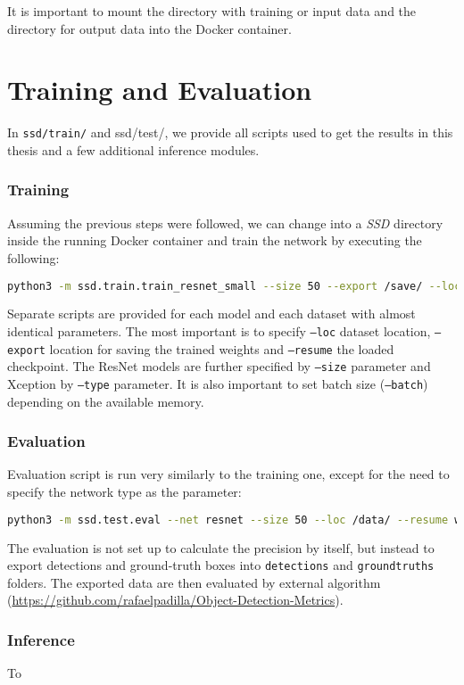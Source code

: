 It is important to mount the directory with training or input data and the directory for output data into the Docker container.


\section{Training and Evaluation}

In {\tt ssd/train/} and {ssd/test/}, we provide all scripts used to get the results in this thesis and a few additional inference modules. 

\subsubsection{Training}
Assuming the previous steps were followed, we can change into a \textit{SSD} directory inside the running Docker container and train the network by executing the following:

\begin{lstlisting}[breaklines, frame=single, language=Bash, basicstyle=\ttfamily]
  python3 -m ssd.train.train_resnet_small --size 50 --export /save/ --loc /data/ --resume imgnet
\end{lstlisting}

Separate scripts are provided for each model and each dataset with almost identical parameters. The most important is to specify {\tt --loc} dataset location, {\tt --export} location for saving the trained weights and {\tt --resume} the loaded checkpoint. The ResNet models are further specified by {\tt --size} parameter and Xception by {\tt --type} parameter. It is also important to set batch size ({\tt --batch}) depending on the available memory. 

\subsubsection{Evaluation}
Evaluation script is run very similarly to the training one, except for the need to specify the network type as the parameter:
\begin{lstlisting}[breaklines, frame=single, language=Bash, basicstyle=\ttfamily]
  python3 -m ssd.test.eval --net resnet --size 50 --loc /data/ --resume weights --batch 16
\end{lstlisting}
The evaluation is not set up to calculate the precision by itself, but instead to export detections and ground-truth boxes into {\tt detections} and {\tt groundtruths} folders. The exported data are then evaluated by external algorithm (\url{https://github.com/rafaelpadilla/Object-Detection-Metrics}).

\subsubsection{Inference}
To 





